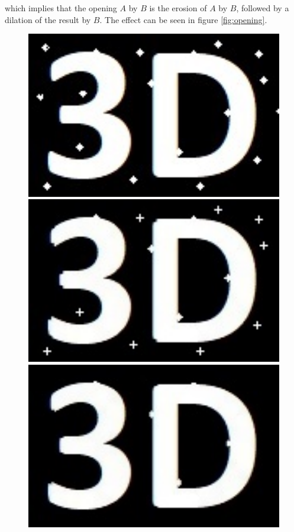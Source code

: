 which implies that the opening $A$ by $B$ is the erosion of $A$ by $B$, followed by a dilation of the result by $B$.
The effect can be seen in figure \ref{fig:opening}.
\begin{figure}[h!]
	\centering
	\begin{minipage}[t]{0.24\textwidth}
		\centering
		\includegraphics[width=1\textwidth]{figures/ImageAnalysis/Reconstruct/reconstruct_3D_Open.jpg}
	\end{minipage}
	\begin{minipage}[t]{0.24\textwidth}
		\centering	
		\includegraphics[width=1\textwidth]{figures/ImageAnalysis/Reconstruct/3D_Open_Cross.jpg}
	\end{minipage}
	\begin{minipage}[t]{0.24\textwidth}
		\centering	
		\includegraphics[width=1\textwidth]{figures/ImageAnalysis/Reconstruct/3D_Open_Ellipse.jpg}

\end{minipage}
\end{figure}
